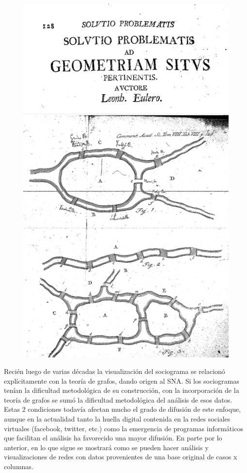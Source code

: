 \documentclass[
  letterpaper,
  DIV=11,
  numbers=noendperiod]{scrreprt}
\begin{document}
\begin{tcolorbox}
\begin{figure}[H]
{\centering \includegraphics{./_book/Inputs/Images/euler_article.png}

}

\end{figure}

\end{tcolorbox}

Recién luego de varias décadas la visualización del sociograma se
relacionó explícitamente con la teoría de grafos, dando origen al SNA.
Si los sociogramas tenían la dificultad metodológica de su construcción,
con la incorporación de la teoría de grafos se sumó la dificultad
metodológica del análisis de esos datos. Estas 2 condiciones todavía
afectan mucho el grado de difusión de este enfoque, aunque en la
actualidad tanto la huella digital contenida en la redes sociales
virtuales (facebook, twitter, etc.) como la emergencia de programas
informáticos que facilitan el análisis ha favorecido una mayor difusión.
En parte por lo anterior, en lo que sigue se mostrará como se pueden
hacer análisis y visualizaciones de redes con datos provenientes de una
base original de casos x columnas.
\end{document}
